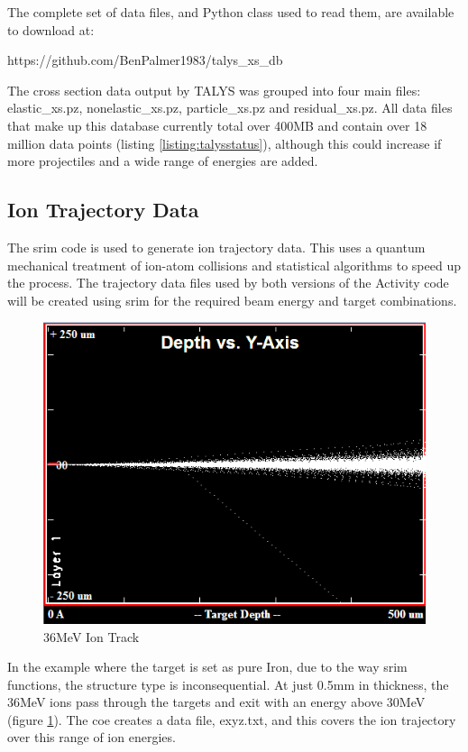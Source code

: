 The complete set of data files, and Python class used to read them, are available to download at:

https://github.com/BenPalmer1983/talys\_xs\_db 

The cross section data output by TALYS was grouped into four main files: elastic\_xs.pz, nonelastic\_xs.pz, particle\_xs.pz and residual\_xs.pz.  All data files that make up this database currently total over 400MB and contain over 18 million data points (listing \ref{listing:talysstatus}), although this could increase if more projectiles and a wide range of energies are added.





\FloatBarrier
\subsection{Ion Trajectory Data}

The \acrshort{srim} code is used to generate ion trajectory data.  This uses a quantum mechanical treatment of ion-atom collisions and statistical algorithms to speed up the process\cite{srimwebsite}.  The trajectory data files used by both versions of the Activity code will be created using \acrshort{srim} for the required beam energy and target combinations.

\begin{figure}[htb]
  \begin{center}
    \includegraphics[width=0.5\linewidth]{chapters/activity_code/images/ion_transport.png}
    \caption{36MeV Ion Track}
    \label{figure:36mevionsiniron}
  \end{center}
\end{figure}
In the example where the target is set as pure Iron, due to the way \acrshort{srim} functions, the structure type is inconsequential.  At just 0.5mm in thickness, the 36MeV ions pass through the targets and exit with an energy above 30MeV (figure \ref{figure:36mevionsiniron}).  The coe creates a data file, exyz.txt, and this covers the ion trajectory over this range of ion energies.


